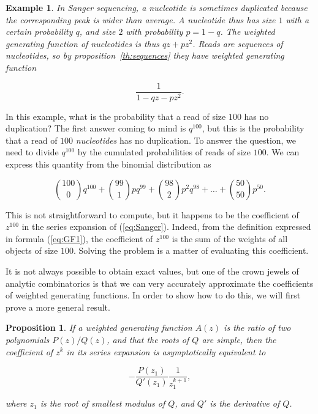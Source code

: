 \documentclass{article}
\newtheorem{example}{Example}
\newtheorem{proposition}{Proposition}
\begin{document}
\begin{example}
\label{ex:Sanger}
In Sanger sequencing, a nucleotide is sometimes duplicated because the
corresponding peak is wider than average. A nucleotide thus has size $1$
with a certain probability $q$, and size $2$ with probability $p = 1-q$.
The weighted generating function of nucleotides is thus $qz + pz^2$. Reads
are sequences of nucleotides, so by proposition~\ref{th:sequences} they
have weighted generating function

\begin{equation}
\label{eq:Sanger}
\frac{1}{1-qz-pz^2}.
\end{equation}
\end{example}

In this example, what is the probability that a read of size $100$ has no
duplication? The first answer coming to mind is $q^{100}$, but this is the
probability that a read of $100$ \emph{nucleotides} has no duplication. To
answer the question, we need to divide $q^{100}$ by the cumulated
probabilities of reads of size $100$. We can express this quantity from
the binomial distribution as

\begin{equation*}
{100 \choose 0}q^{100} + {99 \choose 1}pq^{99} + {98 \choose 2}p^2q^{98} +
\ldots + {50 \choose 50}p^{50}.
\end{equation*}

This is not straightforward to compute, but it happens to be the
coefficient of $z^{100}$ in the series expansion of (\ref{eq:Sanger}).
Indeed, from the definition expressed in formula (\ref{eq:GF1}), the
coefficient of $z^{100}$ is the sum of the weights of all objects of size
$100$.  Solving the problem is a matter of evaluating this coefficient.


It is not always possible to obtain exact values, but one of the crown
jewels of analytic combinatorics is that we can very accurately
approximate the coefficients of weighted generating functions.  In order
to show how to do this, we will first prove a more general result.

\begin{proposition}
\label{th:ass}
If a weighted generating function $A(z)$ is the ratio of two polynomials
$P(z)/Q(z)$, and that the roots of $Q$ are simple, then the coefficient of
$z^k$ in its series expansion is asymptotically equivalent to

\begin{equation}
\label{eq:ass}
-\frac{P(z_1)}{Q'(z_1)}\frac{1}{z_1^{k+1}},
\end{equation}

\noindent
where $z_1$ is the root of smallest modulus of $Q$,
and $Q'$ is the derivative of $Q$.
\end{proposition}
\end{document}
